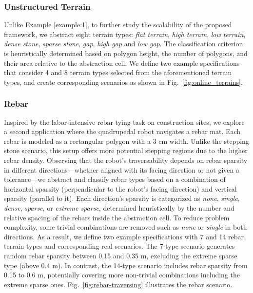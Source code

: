 \documentclass[letterpaper, 10 pt, conference]{ieeeconf}
\begin{document}
\subsubsection{Unstructured Terrain}
Unlike Example \ref{example:1}, to further study the scalability of the proposed framework, we abstract eight terrain types: \textit{flat terrain}, \textit{high terrain}, \textit{low terrain}, \textit{dense stone}, \textit{sparse stone}, \textit{gap}, \textit{high gap} and \textit{low gap}. The classification criterion is heuristically determined based on polygon height, the number of polygons, and their area relative to the abstraction cell.  We define two example specifications that consider 4 and 8 terrain types selected from the aforementioned terrain types, and create corresponding scenarios as shown in Fig.~\ref{fig:online_terrains}.

\subsubsection{Rebar}
Inspired by the labor-intensive rebar tying task on construction sites, we explore a second application where the quadrupedal robot navigates a rebar mat. Each rebar is modeled as a rectangular polygon with a 3 cm width. Unlike the stepping stone scenario, this setup offers more potential stepping regions due to the higher rebar density. Observing that the robot's traversability depends on rebar sparsity in different directions—whether aligned with its facing direction or not given a tolerance—we abstract and classify rebar types based on a combination of horizontal sparsity (perpendicular to the robot's facing direction) and vertical sparsity (parallel to it). Each direction's sparsity is categorized as \textit{none}, \textit{single}, \textit{dense}, \textit{sparse}, or \textit{extreme sparse}, determined heuristically by the number and relative spacing of the rebars inside the abstraction cell. To reduce problem complexity, some trivial combinations are removed such as \textit{none} or \textit{single} in both directions. As a result, we define two example specifications with 7 and 14 rebar terrain types and corresponding real scenarios. The 7-type scenario generates random rebar sparsity between 0.15 and 0.35 m, excluding the extreme sparse type (above 0.4 m). In contrast, the 14-type scenario includes rebar sparsity from 0.15 to 0.6 m, potentially covering more non-trivial combinations including the extreme sparse ones.
Fig.~\ref{fig:rebar-traversing} illustrates the rebar scenario.
\end{document}
